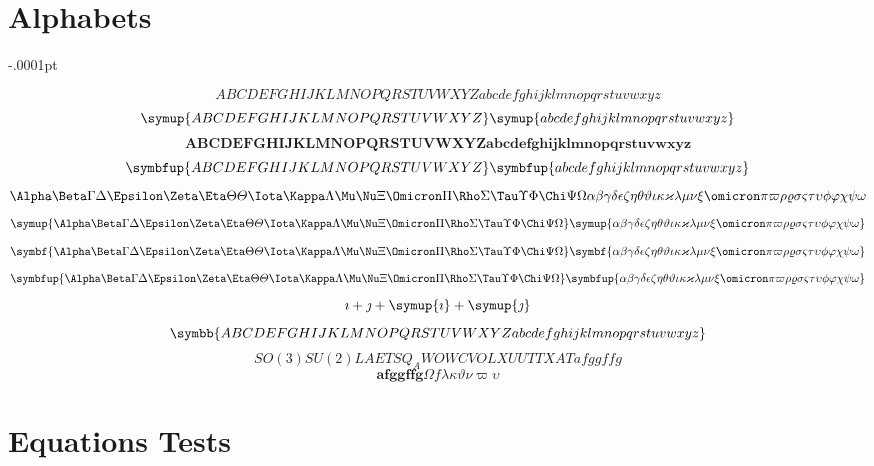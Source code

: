 \documentclass{article}
\def\Latinalphabets{ABCDEFGHIJKLMNOPQRSTUVWXYZ}
\def\latinalphabets{abcdefghijklmnopqrstuvwxyz}
\def\Greekalphabets{%
  \Alpha      \Beta       \Gamma      \Delta      \Epsilon
  \Zeta       \Eta        \Theta      \varTheta   \Iota
  \Kappa      \Lambda     \Mu         \Nu         \Xi
  \Omicron    \Pi         \Rho        \Sigma      \Tau
  \Upsilon    \Phi        \Chi        \Psi        \Omega
}
\def\greekalphabets{%
  \alpha      \beta       \gamma      \delta      \epsilon
   \zeta       \eta        \theta      \vartheta 
  \iota       \kappa      \varkappa   \lambda     \mu
  \nu         \xi         \omicron    \pi \varpi        \rho
  \varrho     \sigma      \varsigma   \tau        \upsilon
  \phi        \varphi     \chi        \psi        \omega
}
\begin{document}
\section{Alphabets}
\delimitershortfall-.0001pt

       \[ \Latinalphabets \latinalphabets \]
       \[ \symup{\Latinalphabets} \symup{\latinalphabets} \]
       \[ \symbf{\Latinalphabets} \symbf{\latinalphabets}\]
       \[ \symbfup{\Latinalphabets}  \symbfup{\latinalphabets} \]
       \[ \Greekalphabets \greekalphabets\]
       \[ \symup{\Greekalphabets} \symup{\greekalphabets} \]
       \[ \symbf{\Greekalphabets} \symbf{\greekalphabets} \]
       \[ \symbfup{\Greekalphabets} \symbfup{\greekalphabets} \]
       \[ \imath + \jmath + \symup{\imath} + \symup{\jmath} \]
       \[ \symbb{\Latinalphabets \latinalphabets} \]
       \[SO(3)SU(2)LAETSQ_AWOWCVO LX UUTTXAT afggffg\]
       \[\symbf{afggffg} \Omega f \lambda\kappa\vartheta\nu\varpi\upsilon\]

\section{Equations Tests}
\end{document}
